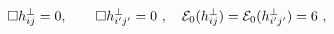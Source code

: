 \begin{equation}\label{decoup3}
\Box h^{\perp}_{ij} = 0, \qquad \Box h^{\perp}_{i'j'} =0 ~,~~~
{\cal E}_0 (h^{\perp}_{ij})
          = {\cal E}_0(h^{\perp}_{i'j'}) = 6 ~,
\end{equation}

